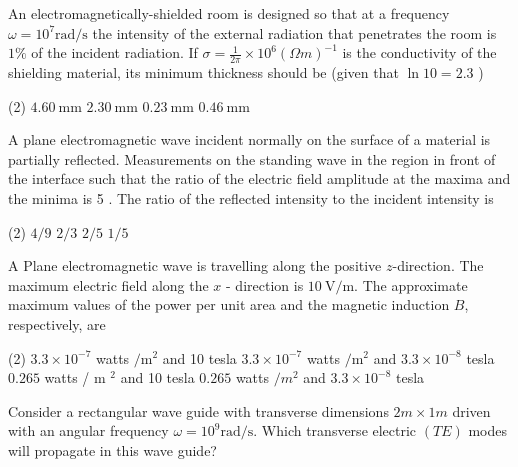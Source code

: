 \begin{enumerate}
\begin{minipage}{\textwidth}
	\item An electromagnetically-shielded room is designed so that at a frequency $\omega=10^{7} \mathrm{rad} / \mathrm{s}$ the intensity of the external radiation that penetrates the room is $1 \%$ of the incident radiation. If $\sigma=\frac{1}{2 \pi} \times 10^{6}(\Omega m)^{-1}$ is the conductivity of the shielding material, its minimum thickness should be (given that $\ln 10=2.3$ )
\end{minipage}
\begin{tasks}(2)
	\task[\textbf{A.}] $4.60 \mathrm{~mm}$
	\task[\textbf{B.}]$2.30 \mathrm{~mm}$
	\task[\textbf{C.}] $0.23 \mathrm{~mm}$
	\task[\textbf{D.}]$0.46 \mathrm{~mm}$
\end{tasks}
\begin{minipage}{\textwidth}
	\item A plane electromagnetic wave incident normally on the surface of a material is partially reflected. Measurements on the standing wave in the region in front of the interface such that the ratio of the electric field amplitude at the maxima and the minima is 5 . The ratio of the reflected intensity to the incident intensity is
\end{minipage}
\begin{tasks}(2)
	\task[\textbf{A.}] $4 / 9$
	\task[\textbf{B.}] $2 / 3$
	\task[\textbf{C.}]$2 / 5$
	\task[\textbf{D.}]$1 / 5$
\end{tasks}
\begin{minipage}{\textwidth}
	\item A Plane electromagnetic wave is travelling along the positive $z$-direction. The maximum electric field along the $x$ - direction is $10 \mathrm{~V} / \mathrm{m}$. The approximate maximum values of the power per unit area and the magnetic induction $B$, respectively, are
\end{minipage}
\begin{tasks}(2)
	\task[\textbf{A.}] $3.3 \times 10^{-7}$ watts $/ \mathrm{m}^{2}$ and 10 tesla
	\task[\textbf{B.}]$3.3 \times 10^{-7}$ watts $/ \mathrm{m}^{2}$ and $3.3 \times 10^{-8}$ tesla
	\task[\textbf{C.}]$0.265$ watts / m $^{2}$ and 10 tesla
	\task[\textbf{D.}]$0.265$ watts $/ m^{2}$ and $3.3 \times 10^{-8}$ tesla	
\end{tasks}
\begin{minipage}{\textwidth}
	\item Consider a rectangular wave guide with transverse dimensions $2 m \times 1 m$ driven with an angular frequency $\omega=10^{9} \mathrm{rad} / \mathrm{s}$. Which transverse electric $(T E)$ modes will propagate in this wave guide?

\end{minipage}
\end{enumerate}
